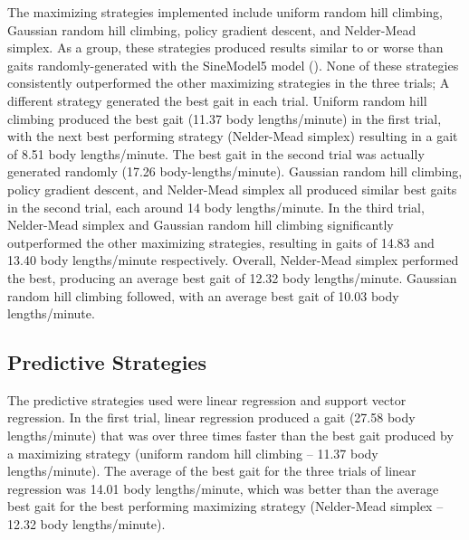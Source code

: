 The maximizing strategies implemented include uniform random hill
climbing, Gaussian random hill climbing, policy gradient descent, and
Nelder-Mead simplex. As a group, these strategies produced results
similar to or worse than gaits randomly-generated with the SineModel5 model (). None
of these strategies consistently outperformed the other maximizing strategies in the three
trials; A different strategy generated the best gait in each
trial. Uniform random hill climbing produced the best gait (11.37 body
lengths/minute) in the first trial, with the next best performing
strategy (Nelder-Mead simplex) resulting in a gait of 8.51 body
lengths/minute. The best gait in the second trial was actually
generated randomly (17.26 body-lengths/minute). Gaussian random hill
climbing, policy gradient descent, and Nelder-Mead simplex all
produced similar best gaits in the second trial, each around 14 body
lengths/minute. In the third trial, Nelder-Mead simplex and Gaussian
random hill climbing significantly outperformed the other maximizing
strategies, resulting in gaits of 14.83 and 13.40 body lengths/minute
respectively. Overall, Nelder-Mead simplex performed the best,
producing an average best gait of 12.32 body lengths/minute. Gaussian
random hill climbing followed, with an average best gait of 10.03 body
lengths/minute.



\subsection{Predictive Strategies}

The predictive strategies used were linear regression and support
vector regression. In the first trial, linear regression produced a
gait (27.58 body lengths/minute) that was over three times faster than
the best gait produced by a maximizing strategy (uniform random hill
climbing -- 11.37 body lengths/minute). The average of the best gait
for the three trials of linear regression was 14.01 body
lengths/minute, which was better than the average best gait for the
best performing maximizing strategy (Nelder-Mead simplex -- 12.32 body
lengths/minute).

%
%




